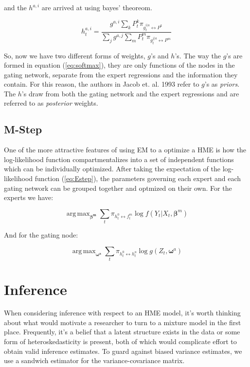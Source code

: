 \documentclass[12pt]{article}
\newcommand{\gateprod}[2]{\pi_{#1 \longleftrightarrow #2}}
\newcommand{\shortsum}[1]{\sum \nolimits_{#1}}
\newcommand{\h}[2]{h^{#1}_{#2}}
\DeclareMathOperator*{\argmax}{arg\,max}
\begin{document}
and the $h^{a, i}$ are arrived at using bayes' theoreom.

\begin{equation} \label{eq:posteriornode}
  \h{a,i}{t} = \frac{g^{a, i} \shortsum{k} P^{k}_{t} \gateprod{g^{i|a}_{t}}{P^{k}}}{\shortsum{j} g^{a, j} \shortsum{m} P^{m}_{t} \gateprod{g^{j|a}_{t}}{P^{m}}}
\end{equation}


So, now we have two different forms of weights, $g$'s and $h$'s. The
way the $g$'s are formed in equation (\ref{eq:softmax}), they are only
functions of the nodes in the gating network, separate from the
expert regressions and the information they contain. For this reason,
the authors in Jacob et. al. 1993 refer to $g$'s as \textit{priors}.
The $h$'s draw from both the gating network and the expert regressions and
are referred to as \textit{posterior} weights.


\subsection{M-Step}

One of the more attractive features of using EM to a optimize a
HME is how the log-likelihood function compartmentalizes into a set 
of independent functions which can be individually optimized. After
taking the expectation of the log-likelihood function (\ref{eq:Estep}), the
parameters governing each expert and each gating network can be grouped
together and optmized on their own. For the experts we have:

\begin{equation}
  \argmax_{\boldsymbol{\beta^{m}}} \sum_{t} \gateprod{h^{0}_{t}}{f^{m}_{t}} \log f (Y_{t}|X_{t}, \boldsymbol{\beta}^{m})
\end{equation}

And for the gating node:

\begin{equation}
  \argmax_{\boldsymbol{\omega^{a}}} \sum_{t} \gateprod{h^{0}_{t}}{h^{a}_{t}} \log g(Z_{t}, \boldsymbol{\omega}^{a})
\end{equation}






\section{Inference} \label{sec:Inference}

When considering inference with respect to an HME model, it's worth thinking
about what would motivate a researcher to turn to a mixture model in the
first place. Frequently, it's a belief that a latent structure exists in 
the data or some form of heteroskedasticity is present, both of which would complicate 
effort to obtain valid inference estimates. To guard against biased variance 
estimates, we use a sandwich estimator for the variance-covariance matrix.
 
\end{document}
